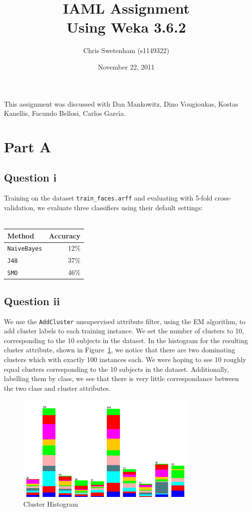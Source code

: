 \documentclass[a4paper]{article}
\author{Chris Swetenham (s1149322)}
\title{IAML Assignment \\ \large Using Weka 3.6.2}
\date{November 22, 2011}
\begin{document}
\maketitle

This assignment was discussed with Dan Mankowitz, Dino Vougioukas, Kostas Kanellis, Facundo Bellosi, Carlos Garc\'{\i}a.

\clearpage

\section*{Part A}

\subsection*{Question i}
Training on the dataset {\tt train\_faces.arff} and evaluating with 5-fold cross-validation, we evaluate three classifiers using their default settings: \\
\\
\begin{tabular}{lr}
Method & Accuracy \\
\hline
{\tt NaiveBayes} & 12\% \\
{\tt J48} & 37\% \\
{\tt SMO} & 46\%
\end{tabular}

\subsection*{Question ii}
We use the {\tt AddCluster} unsupervised attribute filter, using the EM algorithm, to add cluster labels to each training instance. We set the number of clusters to 10, corresponding to the 10 subjects in the dataset.
In the histogram for the resulting cluster attribute, shown in Figure~\ref{fig:a2img1}, we notice that there are two dominating clusters which with exactly 100 instances each. We were hoping to see 10 roughly equal clusters corresponding to the 10 subjects in the dataset. Additionally, labelling them by class, we see that there is very little correspondance between the two class and cluster attributes.

\begin{figure}[!htbp]
\centering
\includegraphics[width=0.8\textwidth]{A2-img1-clusters-cropped.png}
\caption{Cluster Histogram}
\label{fig:a2img1}
\end{figure}
\end{document}
